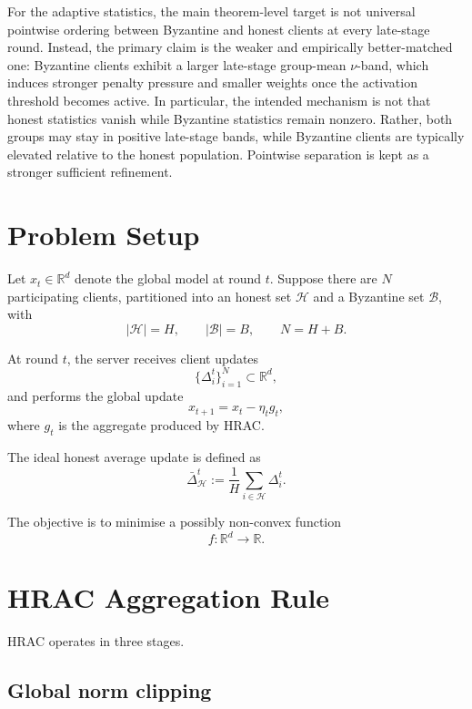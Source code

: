 \documentclass[11pt,a4paper]{article}
\theoremstyle{remark}
\newcommand{\R}{\mathbb{R}}
\newcommand{\HH}{\mathcal{H}}
\newcommand{\BB}{\mathcal{B}}
\begin{document}
For the adaptive statistics, the main theorem-level target is not universal
pointwise ordering between Byzantine and honest clients at every late-stage
round. Instead, the primary claim is the weaker and empirically better-matched
one: Byzantine clients exhibit a larger late-stage group-mean \(\nu\)-band,
which induces stronger penalty pressure and smaller weights once the activation
threshold becomes active. In particular, the intended mechanism is not that
honest statistics vanish while Byzantine statistics remain nonzero. Rather,
both groups may stay in positive late-stage bands, while Byzantine clients are
typically elevated relative to the honest population. Pointwise separation is
kept as a stronger sufficient refinement.

\section{Problem Setup}

Let \(x_t \in \R^d\) denote the global model at round \(t\).
Suppose there are \(N\) participating clients, partitioned into an honest set
\(\HH\) and a Byzantine set \(\BB\), with
\[
    |\HH| = H, \qquad |\BB| = B, \qquad N = H + B.
\]

At round \(t\), the server receives client updates
\[
    \{\Delta_i^t\}_{i=1}^N \subset \R^d,
\]
and performs the global update
\begin{equation}
    x_{t+1} = x_t - \eta_t g_t,
    \label{eq:server_update}
\end{equation}
where \(g_t\) is the aggregate produced by HRAC.

The ideal honest average update is defined as
\begin{equation}
    \bar{\Delta}_{\HH}^t
    :=
    \frac{1}{H} \sum_{i \in \HH} \Delta_i^t.
    \label{eq:honest_average}
\end{equation}

The objective is to minimise a possibly non-convex function
\[
    f : \R^d \to \R.
\]

\section{HRAC Aggregation Rule}

HRAC operates in three stages.

\subsection{Global norm clipping}
\end{document}
